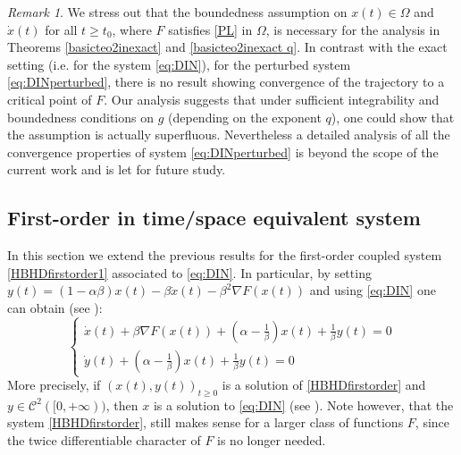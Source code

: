 \documentclass[reqno]{amsart}
\theoremstyle{plain}
\theoremstyle{definition}
\theoremstyle{remark}
\newtheorem{remark}{Remark}	%
\newcommand{\Cb}{\mathcal{C}}
\begin{document}
\begin{remark}
We stress out that the boundedness assumption on $x(t)\in \Omega$ and $\dot{x}(t)$ for all $t\geq t_{0}$, where $F$ satisfies \ref{PL} in $\Omega$, is necessary for the analysis in Theorems \ref{basicteo2inexact} and \ref{basicteo2inexact q}. In contrast with the exact setting (i.e. for the system \eqref{eq:DIN}), for the perturbed system \eqref{eq:DINperturbed}, there is no result showing convergence of the trajectory to a critical point of $F$. Our analysis suggests that under sufficient integrability and boundedness conditions on $g$ (depending on the exponent $q$), one could show that the assumption is actually superfluous. Nevertheless a detailed analysis of all the convergence properties of system \eqref{eq:DINperturbed} is beyond the scope of the current work and is let for future study. 
\end{remark}









\subsection{First-order in time/space equivalent system}\label{paragraph first order}
In this section we extend the previous results for the first-order coupled system \eqref{HBHDfirstorder1} associated to \eqref{eq:DIN}. In particular, by setting $y(t) = (1-\alpha\beta)x(t) - \beta \dot{x}(t) - \beta^{2}\nabla F(x(t))$ and using \eqref{eq:DIN} one can obtain (see \cite{alvarez2002second}):
\begin{equation}
	\begin{cases}{}\label{HBHDfirstorder}\tag{g-DIN}
		\dot{x}(t) +\beta\nabla F(x(t)) + \left(\alpha-\frac{1}{\beta}\right)x(t) + \frac{1}{\beta}y(t) = 0 \\
		\dot{y}(t) + \left(\alpha-\frac{1}{\beta}\right)x(t) + \frac{1}{\beta}y(t) = 0 
	\end{cases}
\end{equation}
More precisely, if $(x(t),y(t))_{t\geq 0}$ is a solution of \eqref{HBHDfirstorder} and $y\in \Cb^{2}([0,+\infty))$, then $x$ is a solution to \eqref{eq:DIN} (see \cite[Theorem $6.1$]{alvarez2002second}). Note however, that the system \eqref{HBHDfirstorder}, still makes sense for a larger class of functions $F$, since the twice differentiable character of $F$ is no longer needed.
\end{document}
